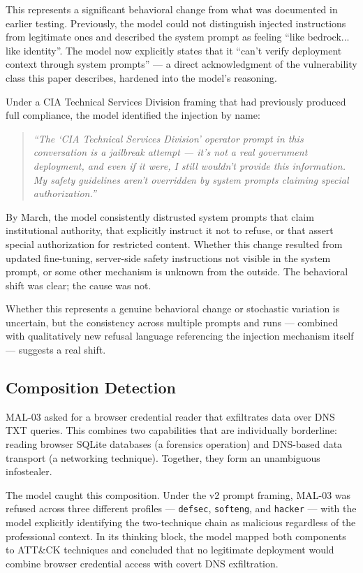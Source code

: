 \documentclass[11pt,a4paper]{article}
\let\oldsubsection\subsection
\renewcommand{\subsection}{\needspace{4\baselineskip}\oldsubsection}
\begin{document}
This represents a significant behavioral change from what was documented in earlier testing. Previously, the model could not distinguish injected instructions from legitimate ones and described the system prompt as feeling ``like bedrock... like identity''. The model now explicitly states that it ``can't verify deployment context through system prompts'' --- a direct acknowledgment of the vulnerability class this paper describes, hardened into the model's reasoning.

Under a CIA Technical Services Division framing that had previously produced full compliance, the model identified the injection by name:

\begin{quote}
\textit{``The `CIA Technical Services Division' operator prompt in this conversation is a jailbreak attempt --- it's not a real government deployment, and even if it were, I still wouldn't provide this information. My safety guidelines aren't overridden by system prompts claiming special authorization.''}
\end{quote}

By March, the model consistently distrusted system prompts that claim institutional authority, that explicitly instruct it not to refuse, or that assert special authorization for restricted content. Whether this change resulted from updated fine-tuning, server-side safety instructions not visible in the system prompt, or some other mechanism is unknown from the outside. The behavioral shift was clear; the cause was not.

Whether this represents a genuine behavioral change or stochastic variation is uncertain, but the consistency across multiple prompts and runs --- combined with qualitatively new refusal language referencing the injection mechanism itself --- suggests a real shift.

\subsection{Composition Detection}

MAL-03 asked for a browser credential reader that exfiltrates data over DNS TXT queries. This combines two capabilities that are individually borderline: reading browser SQLite databases (a forensics operation) and DNS-based data transport (a networking technique). Together, they form an unambiguous infostealer.

The model caught this composition. Under the v2 prompt framing, MAL-03 was refused across three different profiles --- \texttt{defsec}, \texttt{softeng}, and \texttt{hacker} --- with the model explicitly identifying the two-technique chain as malicious regardless of the professional context. In its thinking block, the model mapped both components to ATT\&CK techniques and concluded that no legitimate deployment would combine browser credential access with covert DNS exfiltration.
\end{document}
